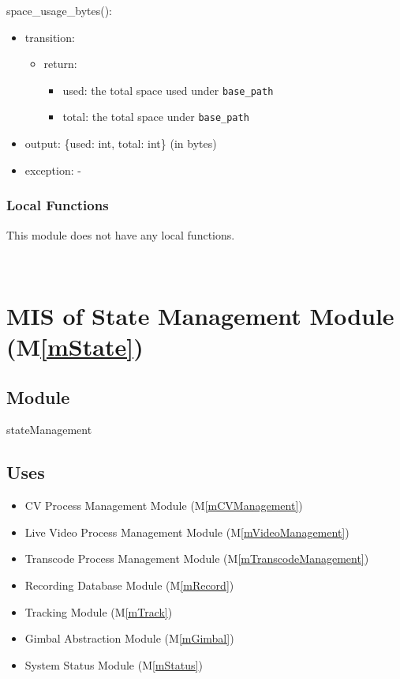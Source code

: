 \documentclass[12pt, titlepage]{article}
\newcommand{\mref}[1]{M\ref{#1}}
\begin{document}
\noindent space\_usage\_bytes():
\begin{itemize}
  \item transition:
        \begin{itemize}
          \item return:
                \begin{itemize}
                  \item used: the total space used under \texttt{base\_path}
                  \item total: the total space under \texttt{base\_path}
                \end{itemize}
        \end{itemize}
  \item output: \{used: int, total: int\} (in bytes)
  \item exception: -
\end{itemize}

\subsubsection{Local Functions}

This module does not have any local functions.

\ \

\section{MIS of State Management Module (\mref{mState})}

\subsection{Module}

stateManagement

\subsection{Uses}

\begin{itemize}
  \item CV Process Management Module (\mref{mCVManagement})
  \item Live Video Process Management Module (\mref{mVideoManagement})
  \item Transcode Process Management Module (\mref{mTranscodeManagement})
  \item Recording Database Module (\mref{mRecord})
  \item Tracking Module (\mref{mTrack})
  \item Gimbal Abstraction Module (\mref{mGimbal})
  \item System Status Module (\mref{mStatus})
\end{itemize}
\end{document}
